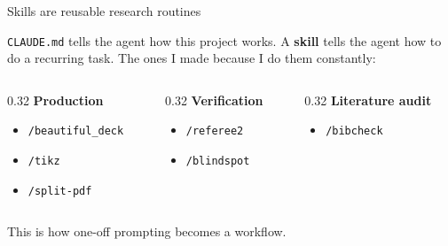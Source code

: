 \documentclass[aspectratio=169,11pt]{beamer}
\begin{document}
\begin{frame}[fragile]{Skills are reusable research routines}

\texttt{CLAUDE.md} tells the agent how this project works. A \textbf{skill} tells the agent how to do a recurring task. The ones I made because I do them constantly:

\vspace{0.3cm}

\begin{columns}[T]
\begin{column}{0.32\textwidth}
\textbf{Production}
\begin{itemize}\setlength\itemsep{0.15em}
    \item \texttt{/beautiful\_deck}
    \item \texttt{/tikz}
    \item \texttt{/split-pdf}
\end{itemize}
\end{column}
\begin{column}{0.32\textwidth}
\textbf{Verification}
\begin{itemize}\setlength\itemsep{0.15em}
    \item \texttt{/referee2}
    \item \texttt{/blindspot}
\end{itemize}
\end{column}
\begin{column}{0.32\textwidth}
\textbf{Literature audit}
\begin{itemize}\setlength\itemsep{0.15em}
    \item \texttt{/bibcheck}
\end{itemize}
\end{column}
\end{columns}

\vspace{0.4cm}

\alert{This is how one-off prompting becomes a workflow.}

\end{frame}
\end{document}
